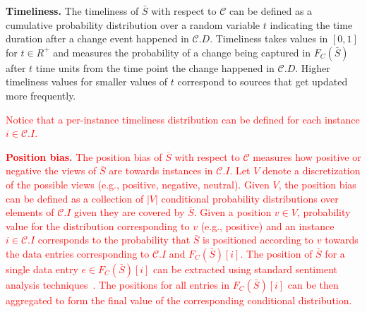\documentclass{sig-alternate}
\begin{document}
\vspace{3pt}\noindent\textbf{Timeliness.} The timeliness of $\bar{S}$ with respect to $\mathcal{C}$ can be defined as a cumulative probability distribution over a random variable $t$ indicating the time duration after a change event happened in $\mathcal{C}.D$. Timeliness takes values in $[0,1]$ for $t \in R^+$ and measures the probability of a change being captured in $F_C(\bar{S})$ after $t$ time units from the time point the change happened in $\mathcal{C}.D$. Higher timeliness values for smaller values of $t$ correspond to sources that get updated more frequently. \textcolor{red}{Notice that a per-instance timeliness distribution can be defined for each instance $i \in \mathcal{C}.I$.


\vspace{3pt}\noindent\textbf{Position bias.} The position bias of $\bar{S}$ with respect to $\mathcal{C}$ measures how positive or negative the views of $\bar{S}$ are towards instances in $\mathcal{C}.I$. Let $V$ denote a discretization of the possible views (e.g., positive, negative, neutral). Given $V$, the position bias can be defined as a collection of $|V|$ conditional probability distributions over elements of $\mathcal{C}.I$ given they are covered by $\bar{S}$. Given a position $v \in V$, probability value for the distribution corresponding to $v$ (e.g., positive) and an instance $i \in \mathcal{C}.I$ corresponds to the probability that $\bar{S}$ is positioned according to $v$ towards the data entries corresponding to $\mathcal{C}.I$ and 
$F_C(\bar{S})[i]$. The position of $\bar{S}$ for a single data entry $e \in F_C(\bar{S})[i]$ can be extracted using standard sentiment analysis techniques~\cite{pang:2002}. The positions for all entries in $F_C(\bar{S})[i]$ can be then aggregated to form the final value of the corresponding conditional distribution.}
\end{document}
